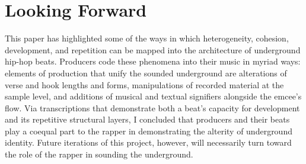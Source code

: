 \section{Looking Forward}
This paper has highlighted some of the ways in which heterogeneity, cohesion, development, and repetition can be mapped into the architecture of underground hip-hop beats. Producers code these phenomena into their music in myriad ways: elements of production that unify the sounded underground are alterations of verse and hook lengths and forms, manipulations of recorded material at the sample level, and additions of musical and textual signifiers alongside the emcee's flow. Via transcriptions that demonstrate both a beat's capacity for development and its repetitive structural layers, I concluded that producers and their beats play a coequal part to the rapper in demonstrating the alterity of underground identity. Future iterations of this project, however, will necessarily turn toward the role of the rapper in sounding the underground.